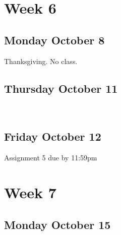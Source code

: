 \documentclass[]{book}
\let\originaltabular\tabular
\let\endoriginaltabular\endtabular
\renewenvironment{tabular}[1]{%
  \begingroup%
  \centering%
  \originaltabular{#1}}%
  {\endoriginaltabular\endgroup}
\theoremstyle{definition}
\theoremstyle{definition}
\theoremstyle{definition}
\theoremstyle{remark}
\begin{document}
\section{Week 6}\label{week-6}

\subsection{Monday October 8}\label{monday-october-8}

\begin{table}[H]
\centering
\begin{tabular}{l}
\hline
Thanksgiving. No class.\\
\hline
\end{tabular}
\end{table}

\subsection{Thursday October 11}\label{thursday-october-11}

\begin{table}[H]
\centering
\begin{tabular}{l}
\hline
\\
\hline
\end{tabular}
\end{table}

\subsection{Friday October 12}\label{friday-october-12}

\begin{table}[H]
\centering
\begin{tabular}{l}
\hline
Assignment 5 due by 11:59pm\\
\hline
\end{tabular}
\end{table}

\section{Week 7}\label{week-7}

\subsection{Monday October 15}\label{monday-october-15}

\begin{table}[H]
\centering
\begin{tabular}{l}
\hline
\\
\hline
\end{tabular}
\end{table}
\end{document}
